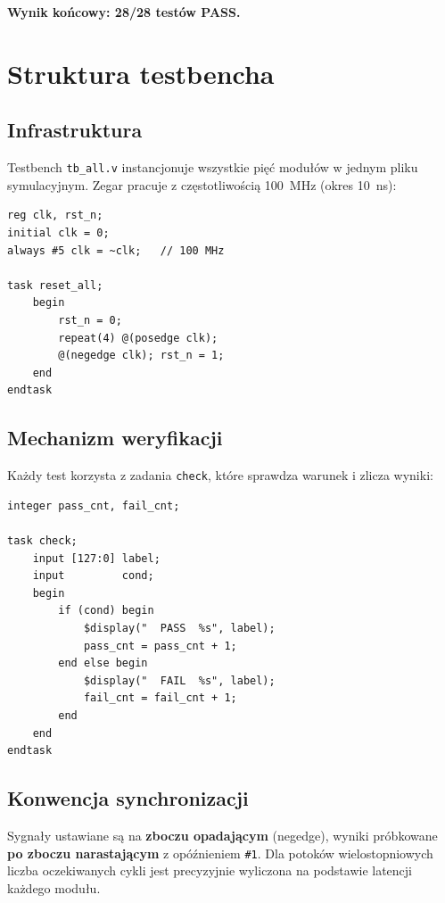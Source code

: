 \documentclass[12pt,a4paper]{article}
\begin{document}
\textbf{Wynik końcowy: 28/28 testów PASS.}

\section{Struktura testbencha}

\subsection{Infrastruktura}

Testbench \texttt{tb\_all.v} instancjonuje wszystkie pięć modułów w jednym pliku symulacyjnym. Zegar pracuje z częstotliwością 100~MHz (okres 10~ns):

\begin{lstlisting}[caption={Generator zegara i reset}]
reg clk, rst_n;
initial clk = 0;
always #5 clk = ~clk;   // 100 MHz

task reset_all;
    begin
        rst_n = 0;
        repeat(4) @(posedge clk);
        @(negedge clk); rst_n = 1;
    end
endtask
\end{lstlisting}

\subsection{Mechanizm weryfikacji}

Każdy test korzysta z zadania \texttt{check}, które sprawdza warunek i zlicza wyniki:

\begin{lstlisting}[caption={Zadanie check}]
integer pass_cnt, fail_cnt;

task check;
    input [127:0] label;
    input         cond;
    begin
        if (cond) begin
            $display("  PASS  %s", label);
            pass_cnt = pass_cnt + 1;
        end else begin
            $display("  FAIL  %s", label);
            fail_cnt = fail_cnt + 1;
        end
    end
endtask
\end{lstlisting}

\subsection{Konwencja synchronizacji}

Sygnały ustawiane są na \textbf{zboczu opadającym} (negedge), wyniki próbkowane \textbf{po zboczu narastającym} z opóźnieniem \texttt{\#1}. Dla potoków wielostopniowych liczba oczekiwanych cykli jest precyzyjnie wyliczona na podstawie latencji każdego modułu.
\end{document}
